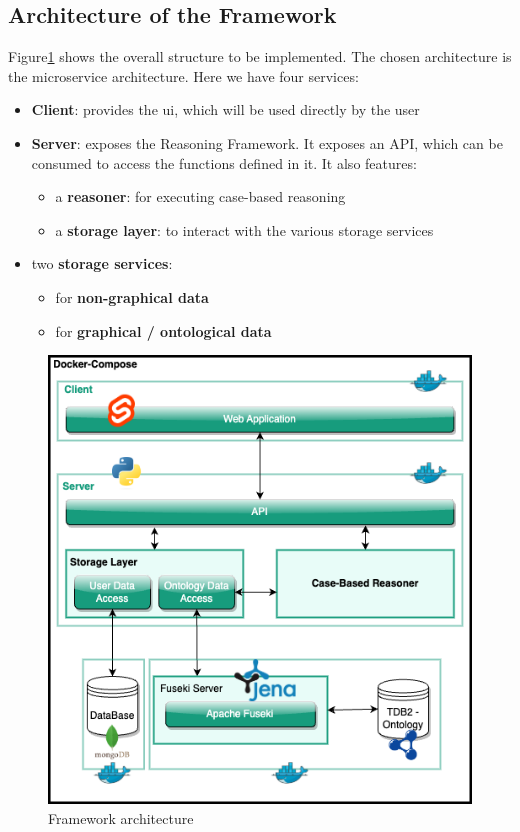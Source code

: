 \subsection{Architecture of the Framework \label{subsec:archi-frame}}
Figure\ref{fig:frame-archi} shows the overall structure to be implemented. The chosen architecture is the microservice architecture. Here we have four services:
\begin{itemize}
    \item \textbf{Client}: provides the \acrfull{ui}, which will be used directly by the user
    \item \textbf{Server}: exposes the Reasoning Framework. It exposes an API, which can be consumed to access the functions defined in it. It also features:
        \begin{itemize}
            \item a \textbf{reasoner}: for executing case-based reasoning
            \item a \textbf{storage layer}: to interact with the various storage services
        \end{itemize}
    
    \item two \textbf{storage services}: 
        \begin{itemize}
            \item for \textbf{non-graphical data}
            \item for \textbf{graphical / ontological data}
        \end{itemize}
\end{itemize}


\begin{figure}[h]
\centering
\includegraphics[scale=0.6]{images/SemanticAssistant-Detailled Architecture.drawio.png}
\caption{\label{fig:frame-archi}  Framework architecture}
\end{figure}


